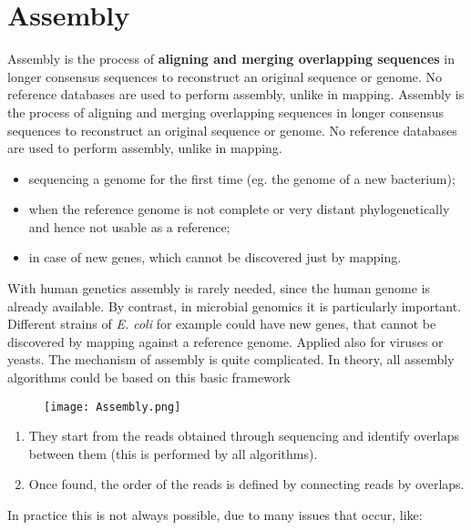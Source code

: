 

\chapter{Assembly}

Assembly is the process of \textbf{aligning and merging overlapping sequences} in longer consensus sequences to reconstruct an original sequence or genome. No reference databases are used to perform assembly, unlike in mapping.
Assembly is the process of aligning and merging overlapping sequences in longer consensus sequences to reconstruct an original sequence or genome. No reference databases are used to perform assembly, unlike in mapping.

\begin{itemize}
    \item sequencing a genome for the first time (eg. the genome of a new bacterium);
    \item when the reference genome is not complete or very distant phylogenetically and hence not usable as a reference;
    \item in case of new genes, which cannot be discovered just by mapping.
\end{itemize}

With human genetics assembly is rarely needed, since the human genome is already available.
By contrast, in microbial genomics it is particularly important. Different strains of \emph{E. coli} for example could have new genes, that cannot be discovered by mapping against a reference genome. Applied also for viruses or yeasts.
The mechanism of assembly is quite complicated.
In theory, all assembly algorithms could be based on this basic framework

\begin{figure}[h]
\centering
\texttt{[image: Assembly.png]}
\caption{}
\end{figure}

\begin{enumerate}
    \item They start from the reads obtained through sequencing and identify overlaps between them (this is performed by all algorithms).
    \item Once found, the order of the reads is defined by connecting reads by overlaps.
\end{enumerate}

In practice this is not always possible, due to many issues that occur, like:

